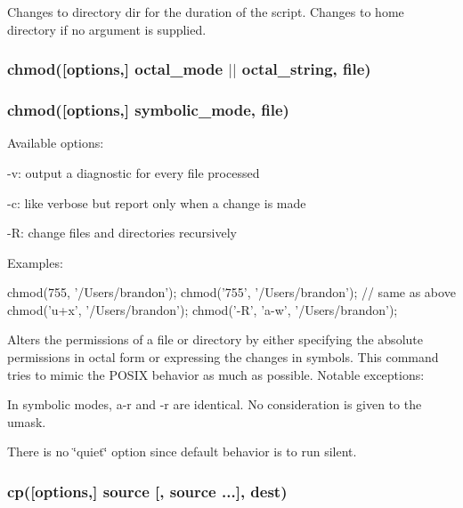 Changes to directory {\ttfamily dir} for the duration of the script. Changes to home directory if no argument is supplied.

\subsubsection*{chmod(\mbox{[}options,\mbox{]} octal\+\_\+mode $\vert$$\vert$ octal\+\_\+string, file)}

\subsubsection*{chmod(\mbox{[}options,\mbox{]} symbolic\+\_\+mode, file)}

Available options\+:


\begin{DoxyItemize}
\item {\ttfamily -\/v}\+: output a diagnostic for every file processed
\item {\ttfamily -\/c}\+: like verbose but report only when a change is made
\item {\ttfamily -\/R}\+: change files and directories recursively
\end{DoxyItemize}

Examples\+:


\begin{DoxyCode}
chmod(755, '/Users/brandon');
chmod('755', '/Users/brandon'); // same as above
chmod('u+x', '/Users/brandon');
chmod('-R', 'a-w', '/Users/brandon');
\end{DoxyCode}


Alters the permissions of a file or directory by either specifying the absolute permissions in octal form or expressing the changes in symbols. This command tries to mimic the P\+O\+S\+IX behavior as much as possible. Notable exceptions\+:


\begin{DoxyItemize}
\item In symbolic modes, \textquotesingle{}a-\/r\textquotesingle{} and \textquotesingle{}-\/r\textquotesingle{} are identical. No consideration is given to the umask.
\item There is no \char`\"{}quiet\char`\"{} option since default behavior is to run silent.
\end{DoxyItemize}

\subsubsection*{cp(\mbox{[}options,\mbox{]} source \mbox{[}, source ...\mbox{]}, dest)}

